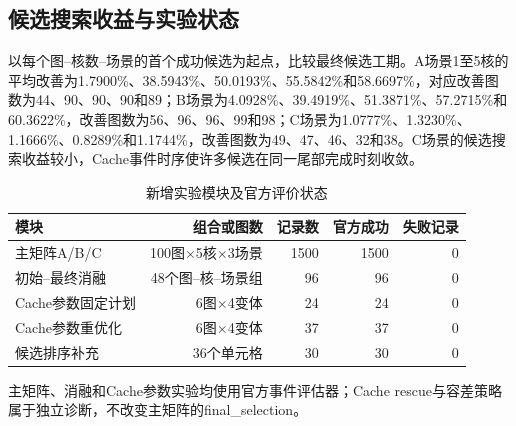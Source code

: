 \subsection{候选搜索收益与实验状态}
以每个图--核数--场景的首个成功候选为起点，比较最终候选工期。A场景1至5核的平均改善为1.7900\%、38.5943\%、50.0193\%、55.5842\%和58.6697\%，对应改善图数为44、90、90、90和89；B场景为4.0928\%、39.4919\%、51.3871\%、57.2715\%和60.3622\%，改善图数为56、96、96、99和98；C场景为1.0777\%、1.3230\%、1.1666\%、0.8289\%和1.1744\%，改善图数为49、47、46、32和38。C场景的候选搜索收益较小，Cache事件时序使许多候选在同一尾部完成时刻收敛。

\begin{table}[H]\centering\small
\caption{新增实验模块及官方评价状态}\label{tab:candidate-status}
\setlength{\tabcolsep}{4pt}
\begin{tabular}{lrrrr}\toprule
模块 & 组合或图数 & 记录数 & 官方成功 & 失败记录\\\midrule
主矩阵A/B/C & 100图$\times$5核$\times$3场景 & 1500 & 1500 & 0\\
初始--最终消融 & 48个图--核--场景组 & 96 & 96 & 0\\
Cache参数固定计划 & 6图$\times$4变体 & 24 & 24 & 0\\
Cache参数重优化 & 6图$\times$4变体 & 37 & 37 & 0\\
候选排序补充 & 36个单元格 & 30 & 30 & 0\\\bottomrule
\end{tabular}\end{table}
主矩阵、消融和Cache参数实验均使用官方事件评估器；Cache rescue与容差策略属于独立诊断，不改变主矩阵的final\_selection。

